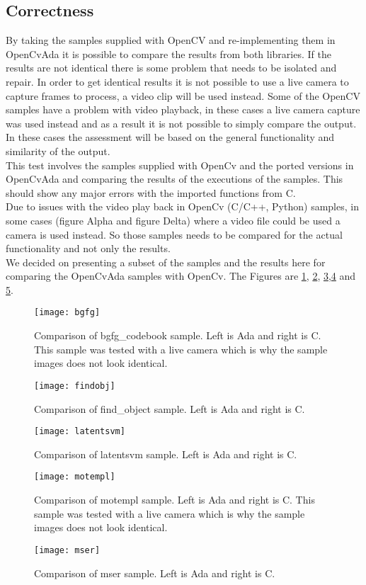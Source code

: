 \subsection{Correctness}
By taking the samples supplied with OpenCV and re-implementing them in OpenCvAda it is possible to compare the results from both libraries. If the results are not identical there is some problem that needs to be isolated and repair. In order to get identical results it is not possible to use a live camera to capture frames to process, a video clip will be used instead. Some of the OpenCV samples have a problem with video playback, in these cases a live camera capture was used instead and as a result it is not possible to simply compare the output. In these cases the assessment will be based on the general functionality and similarity of the output.
\\
This test involves the samples supplied with OpenCv and the ported versions in OpenCvAda and comparing the results of the executions of the samples. This should show any major errors with the imported functions from C.
\\
Due to issues with the video play back in OpenCv (C/C++, Python) samples, in some cases (figure Alpha and figure Delta) where a video file could be used a camera is used instead. So those samples needs to be compared for the actual functionality and not only the results.
\\
We decided on presenting a subset of the samples and the results here for comparing the OpenCvAda samples with OpenCv. The Figures are \ref{fig:bgfg}, \ref{fig:findobj}, \ref{fig:latentsvm},\ref{fig:motempl} and \ref{fig:mser}.
\begin{figure}
\centering
\texttt{[image: bgfg]}
\caption{Comparison of bgfg_codebook sample. Left is Ada and right is C. This sample was tested with a live camera which is why the sample images does not look identical.}
\label{fig:bgfg}
\end{figure}
\begin{figure}
\centering
\texttt{[image: findobj]}
\caption{Comparison of find_object sample. Left is Ada and right is C.}
\label{fig:findobj}
\end{figure}
\begin{figure}
\centering
\texttt{[image: latentsvm]}
\caption{Comparison of latentsvm sample. Left is Ada and right is C.}
\label{fig:latentsvm}
\end{figure}
\begin{figure}
\centering
\texttt{[image: motempl]}
\caption{Comparison of motempl sample. Left is Ada and right is C. This sample was tested with a live camera which is why the sample images does not look identical.}
\label{fig:motempl}
\end{figure}
\begin{figure}
\centering
\texttt{[image: mser]}
\caption{Comparison of mser sample. Left is Ada and right is C.}
\label{fig:mser}
\end{figure}
